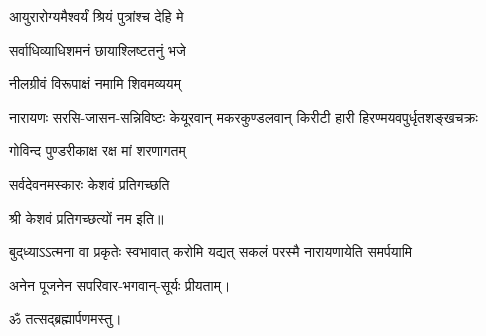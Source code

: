 \begin{center}

{आयुरारोग्यमैश्वर्यं श्रियं पुत्रांश्च देहि मे}

{सर्वाधिव्याधिशमनं छायाश्लिष्टतनुं भजे}

{नीलग्रीवं विरूपाक्षं नमामि शिवमव्ययम्}

{नारायणः सरसि-जासन-सन्निविष्टः}
{केयूरवान् मकरकुण्डलवान् किरीटी}
{हारी हिरण्मयवपुर्धृतशङ्खचक्रः}

{गोविन्द पुण्डरीकाक्ष रक्ष मां शरणागतम्}

{सर्वदेवनमस्कारः केशवं प्रतिगच्छति}

श्री केशवं प्रतिगच्छत्यों नम इति॥



{बुद्‌ध्याऽऽत्मना वा प्रकृतेः स्वभावात्}
{करोमि यद्यत् सकलं परस्मै}
{नारायणायेति समर्पयामि}

अनेन पूजनेन सपरिवार-भगवान्-सूर्यः प्रीयताम्। \\
\end{center}

\centerline{ॐ तत्सद्ब्रह्मार्पणमस्तु।}

\begingroup
\let\chapt\sect
\begin{center}


\end{center}
\endgroup

\closesection
